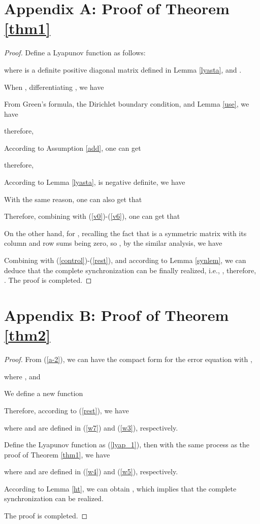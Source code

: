 \documentclass[review]{elsarticle}
\begin{document}
\section*{Appendix A: Proof of Theorem \ref{thm1}}\label{appA}
\begin{proof}
Define a Lyapunov function as follows:

where  is a definite positive diagonal matrix defined in Lemma \ref{lyasta}, and .

When , differentiating , we have


From Green's formula, the Dirichlet boundary
condition, and Lemma \ref{use}, we have

therefore,


According to Assumption \ref{add}, one can get

therefore,


According to Lemma \ref{lyasta},  is negative definite, we have


With the same reason, one can also get that


Therefore, combining with (\ref{v0})-(\ref{v6}), one can get that


On the other hand, for , recalling the fact that  is a symmetric matrix with its column and row sums being zero, so , by the similar analysis, we have


Combining with (\ref{control})-(\ref{rest}), and according to Lemma \ref{synlem}, we can deduce that the complete synchronization can be finally realized, i.e.,
, therefore, . The proof is completed.
\end{proof}

\section*{Appendix B: Proof of Theorem \ref{thm2}}\label{appB}
\begin{proof}
From (\ref{a-2}), we can have the compact form for the error equation with ,

where , and


We define a new function

Therefore, according to (\ref{rest}), we have

where  and  are defined in (\ref{w7}) and (\ref{w3}), respectively.

Define the Lyapunov function as (\ref{lyap_1}), then with the same process as the proof of Theorem \ref{thm1}, we have

where  and  are defined in (\ref{w4}) and (\ref{w5}), respectively.

According to Lemma \ref{ht}, we can obtain , which implies that the complete synchronization can be realized.

The proof is completed.
\end{proof}
\end{document}
